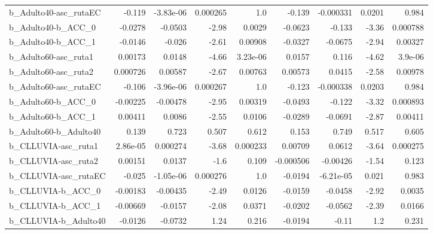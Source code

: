 \begin{tabular}{lrrrrrrrr}
b\_Adulto40-asc\_rutaEC      &      -0.119 &    -3.83e-06 &  0.000265 &      1.0 &     -0.139 &   -0.000331 &       0.0201 &         0.984 \\
b\_Adulto40-b\_ACC\_0         &     -0.0278 &      -0.0503 &     -2.98 &   0.0029 &    -0.0623 &      -0.133 &        -3.36 &      0.000788 \\
b\_Adulto40-b\_ACC\_1         &     -0.0146 &       -0.026 &     -2.61 &  0.00908 &    -0.0327 &     -0.0675 &        -2.94 &       0.00327 \\
b\_Adulto60-asc\_ruta1       &     0.00173 &       0.0148 &     -4.66 & 3.23e-06 &     0.0157 &       0.116 &        -4.62 &       3.9e-06 \\
b\_Adulto60-asc\_ruta2       &    0.000726 &      0.00587 &     -2.67 &  0.00763 &    0.00573 &      0.0415 &        -2.58 &       0.00978 \\
b\_Adulto60-asc\_rutaEC      &      -0.106 &    -3.96e-06 &  0.000267 &      1.0 &     -0.123 &   -0.000338 &       0.0203 &         0.984 \\
b\_Adulto60-b\_ACC\_0         &    -0.00225 &     -0.00478 &     -2.95 &  0.00319 &    -0.0493 &      -0.122 &        -3.32 &      0.000893 \\
b\_Adulto60-b\_ACC\_1         &     0.00411 &       0.0086 &     -2.55 &   0.0106 &    -0.0289 &     -0.0691 &        -2.87 &       0.00411 \\
b\_Adulto60-b\_Adulto40      &       0.139 &        0.723 &     0.507 &    0.612 &      0.153 &       0.749 &        0.517 &         0.605 \\
b\_CLLUVIA-asc\_ruta1        &    2.86e-05 &     0.000274 &     -3.68 & 0.000233 &    0.00709 &      0.0612 &        -3.64 &      0.000275 \\
b\_CLLUVIA-asc\_ruta2        &     0.00151 &       0.0137 &      -1.6 &    0.109 &  -0.000506 &    -0.00426 &        -1.54 &         0.123 \\
b\_CLLUVIA-asc\_rutaEC       &      -0.025 &    -1.05e-06 &  0.000276 &      1.0 &    -0.0194 &   -6.21e-05 &        0.021 &         0.983 \\
b\_CLLUVIA-b\_ACC\_0          &    -0.00183 &     -0.00435 &     -2.49 &   0.0126 &    -0.0159 &     -0.0458 &        -2.92 &        0.0035 \\
b\_CLLUVIA-b\_ACC\_1          &    -0.00669 &      -0.0157 &     -2.08 &   0.0371 &    -0.0202 &     -0.0562 &        -2.39 &        0.0166 \\
b\_CLLUVIA-b\_Adulto40       &     -0.0126 &      -0.0732 &      1.24 &    0.216 &    -0.0194 &       -0.11 &          1.2 &         0.231 \\

\end{tabular}
